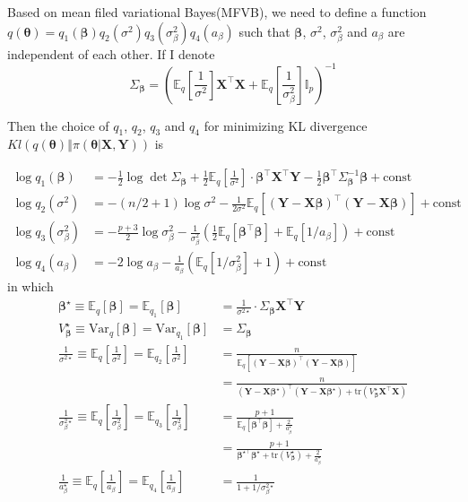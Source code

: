 \documentclass[12pt]{article}
\begin{document}
Based on mean filed variational Bayes(MFVB), we need to define a function $q(\bm{\theta}) = q_1(\bm{\beta})q_2(\sigma^2)q_3(\sigma_{\beta}^2)q_4(a_\beta)$ such that $\bm{\beta}$, $\sigma^2$, $\sigma_{\beta}^2$ and $a_\beta$ are independent of each other. If I denote 
\[ \Sigma_{\bm{\beta}} = \left( \mathbb{E}_q\left[\frac{1}{\sigma^2} \right]\bm{X}^\top \bm{X} + \mathbb{E}_q\left[\frac{1}{\sigma_{\beta}^2} \right]\mathbb{I}_p \right)^{-1}\]

 Then the choice of $q_1$, $q_2$, $q_3$ and $q_4$ for minimizing KL divergence $Kl\left(\left. q(\bm{\theta}) \right\Vert \pi(\left.\bm{\theta}\right\vert \bm{X}, \bm{Y})\right)$ is

\begin{align*}
	\log q_1(\bm{\beta}) &= -\frac{1}{2} \log \det \Sigma_{\bm{\beta}} + \frac{1}{2} \mathbb{E}_q\left[\frac{1}{\sigma^2} \right]\cdot \bm{\beta}^\top \bm{X}^\top \bm{Y} - \frac{1}{2}\bm{\beta}^\top \Sigma_{\bm{\beta}}^{-1} \bm{\beta} + \text{const}  \\
	\log q_2(\sigma^2) &= -(n/2+1)\log \sigma^2 - \frac{1}{2\sigma^2} \mathbb{E}_{q}\left[ (\bm{Y} - \bm{X}\bm{\beta})^\top (\bm{Y} - \bm{X}\bm{\beta}) \right] + \text{const} \\
	\log q_3(\sigma_{\beta}^2) &= -\frac{p+3}{2}\log \sigma_{\beta}^2 - \frac{1}{\sigma_{\beta}^2}\left( \frac{1}{2}\mathbb{E}_{q}[\bm{\beta}^\top \bm{\beta}] + \mathbb{E}_q[1/a_\beta] \right) + \text{const} \\
	\log q_4(a_\beta) &= -2\log a_\beta - \frac{1}{a_\beta} \left( \mathbb{E}_{q}[1/\sigma_{\beta}^2]+1 \right) + \text{const}
\end{align*}
in which
\begin{align*}
	\bm{\beta}^\star \equiv \mathbb{E}_{q}[\bm{\beta}] = \mathbb{E}_{q_1}[\bm{\beta}] &= \frac{1}{\sigma^{2 \star }} \cdot \Sigma_{\bm{\beta}}  \bm{X}^\top \bm{Y}\\
	V_{\bm{\beta}}^\star \equiv  \text{Var}_q[\bm{\beta}] = \text{Var}_{q_1}[\bm{\beta}] &= \Sigma_{\bm{\beta}}\\
	\frac{1}{\sigma^{2\star}}\equiv  \mathbb{E}_{q}\left[\frac{1}{\sigma^2} \right] = \mathbb{E}_{q_2}\left[\frac{1}{\sigma^2} \right] &= \frac{n}{\mathbb{E}_q\left[(\bm{Y} - \bm{X}\bm{\beta})^{\top} (\bm{Y} - \bm{X}\bm{\beta})\right]} \\
	&= \frac{n}{(\bm{Y} - \bm{X}\bm{\beta}^\star)^{\top} (\bm{Y} - \bm{X}\bm{\beta}^\star) + \text{tr}(V_{\bm{\beta}}^{\star} \bm{X}^\top \bm{X})} \\
	\frac{1}{\sigma_{\beta}^{2\star}} \equiv \mathbb{E}_{q}\left[\frac{1}{\sigma_{\beta}^2} \right] = \mathbb{E}_{q_3}\left[\frac{1}{\sigma_{\beta}^2} \right]&=\frac{p+1}{\mathbb{E}_q[\bm{\beta}^\top \bm{\beta}] + \frac{2}{a_\beta^\star}}\\
	&= \frac{p+1}{\bm{\beta}^{\star \top} \bm{\beta}^\star + \text{tr}(V_{\bm{\beta}}^\star) + \frac{2}{a_\beta^\star}}\\
	\frac{1}{a_{\beta}^\star} \equiv \mathbb{E}_q\left[ \frac{1}{a_{\beta}} \right] = \mathbb{E}_{q_4}\left[ \frac{1}{a_{\beta}} \right] &= \frac{1}{1+1/\sigma_{\beta}^{2\star}}
\end{align*}
\end{document}
